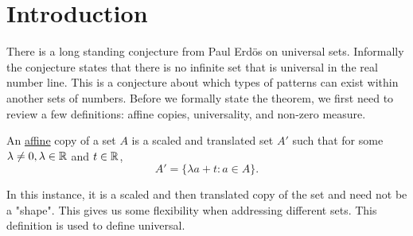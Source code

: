 \chapter{Introduction}

There is a long standing conjecture from Paul Erd\"{o}s on universal sets.  Informally the conjecture states that there is no infinite set that is universal in the real number line.  This is a conjecture about which types of  patterns can exist within another sets of numbers.  Before we formally state the theorem, we first need to review a few definitions: affine copies, universality, and non-zero measure. 

\begin{definition}[Affine]
    
\end{definition}

\begin{definition}
    An \underline{affine} copy of a set $A$ is a scaled and translated set $A'$ such that for some $\lambda\neq 0, \lambda \in \mathbb{R}$ and $t \in \mathbb{R}$,  $$A' = \{\lambda a + t : a \in A\}.$$
\end{definition}
In this instance, it is a scaled and then translated copy of the set and need not be a "shape".  This gives us some flexibility when addressing different sets.  This definition is used to define universal. 

